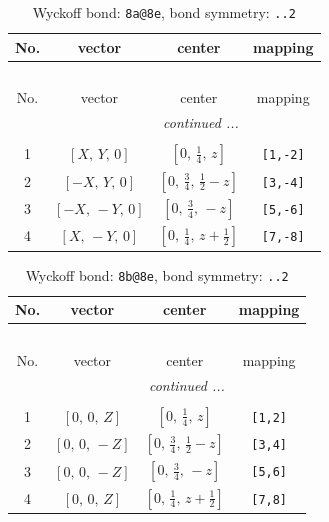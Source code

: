 \documentclass[fleqn,8pt]{jsarticle}
\begin{document}
\begin{longtable}{cccc}
\caption{Wyckoff bond: {\tt 8a@8e}, bond symmetry: {\tt ..2}}
 \\
 \hline \hline
No. & vector & center & mapping \\ \hline \endfirsthead

\multicolumn{3}{l}{\tablename\ \thetable{}} \\
 \hline \hline
No. & vector & center & mapping \\ \hline \endhead

 \hline \hline
\multicolumn{3}{r}{\footnotesize\it continued ...} \\ \endfoot

 \hline \hline
\multicolumn{3}{r}{} \\ \endlastfoot

1 & $\left[ X,\, Y,\, 0 \right]$ & $\left[ 0,\, \frac{1}{4},\, z \right]$ & {\tt [1,-2]} \\ \hline
2 & $\left[ - X,\, Y,\, 0 \right]$ & $\left[ 0,\, \frac{3}{4},\, \frac{1}{2} - z \right]$ & {\tt [3,-4]} \\ \hline
3 & $\left[ - X,\, - Y,\, 0 \right]$ & $\left[ 0,\, \frac{3}{4},\, - z \right]$ & {\tt [5,-6]} \\ \hline
4 & $\left[ X,\, - Y,\, 0 \right]$ & $\left[ 0,\, \frac{1}{4},\, z + \frac{1}{2} \right]$ & {\tt [7,-8]} \\
\end{longtable}
\renewcommand{\arraystretch}{1.2}
\begin{longtable}{cccc}
\caption{Wyckoff bond: {\tt 8b@8e}, bond symmetry: {\tt ..2}}
 \\
 \hline \hline
No. & vector & center & mapping \\ \hline \endfirsthead

\multicolumn{3}{l}{\tablename\ \thetable{}} \\
 \hline \hline
No. & vector & center & mapping \\ \hline \endhead

 \hline \hline
\multicolumn{3}{r}{\footnotesize\it continued ...} \\ \endfoot

 \hline \hline
\multicolumn{3}{r}{} \\ \endlastfoot

1 & $\left[ 0,\, 0,\, Z \right]$ & $\left[ 0,\, \frac{1}{4},\, z \right]$ & {\tt [1,2]} \\ \hline
2 & $\left[ 0,\, 0,\, - Z \right]$ & $\left[ 0,\, \frac{3}{4},\, \frac{1}{2} - z \right]$ & {\tt [3,4]} \\ \hline
3 & $\left[ 0,\, 0,\, - Z \right]$ & $\left[ 0,\, \frac{3}{4},\, - z \right]$ & {\tt [5,6]} \\ \hline
4 & $\left[ 0,\, 0,\, Z \right]$ & $\left[ 0,\, \frac{1}{4},\, z + \frac{1}{2} \right]$ & {\tt [7,8]} \\
\end{longtable}
\end{document}
